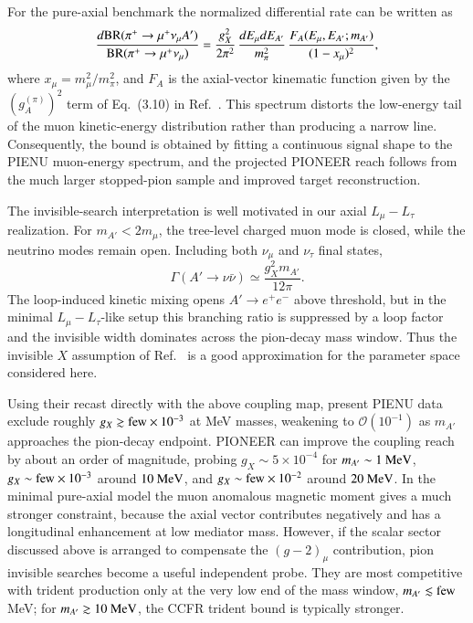 \documentclass[onecolumn, aps, nofootinbib, prd, preprint, floats, floatfix, amsmath, amssymb, superscriptaddress, preprintnumbers]{revtex4-1}
\begin{document}
For the pure-axial benchmark the normalized differential rate can be written as
\begin{equation}
\frac{d{\rm BR}(\pi^+\to\mu^+\nu_\mu A')}
{{\rm BR}(\pi^+\to\mu^+\nu_\mu)}
=\frac{g_X^2}{2\pi^2}\,
\frac{dE_\mu dE_{A'}}{m_\pi^2}\,
\frac{F_A(E_\mu,E_{A'};m_{A'})}{(1-x_\mu)^2},
\label{eq:pion-axial-spectrum}
\end{equation}
where \(x_\mu=m_\mu^2/m_\pi^2\), and \(F_A\) is the axial-vector kinematic function given by the \(\left(g_A^{(\pi)}\right)^2\) term of Eq.~(3.10) in Ref.~\cite{Altmannshofer:2026opc}. This spectrum distorts the low-energy tail of the muon kinetic-energy distribution rather than producing a narrow line. Consequently, the bound is obtained by fitting a continuous signal shape to the PIENU muon-energy spectrum, and the projected PIONEER reach follows from the much larger stopped-pion sample and improved target reconstruction.

The invisible-search interpretation is well motivated in our axial \(L_\mu-L_\tau\) realization. For \(m_{A'}<2m_\mu\), the tree-level charged muon mode is closed, while the neutrino modes remain open. Including both \(\nu_\mu\) and \(\nu_\tau\) final states,
\begin{equation}
\Gamma(A'\to\nu\bar\nu)\simeq \frac{g_X^2m_{A'}}{12\pi}.
\label{eq:ap-neutrino-width}
\end{equation}
The loop-induced kinetic mixing opens \(A'\to e^+e^-\) above threshold, but in the minimal \(L_\mu-L_\tau\)-like setup this branching ratio is suppressed by a loop factor and the invisible width dominates across the pion-decay mass window. Thus the invisible \(X\) assumption of Ref.~\cite{Altmannshofer:2026opc} is a good approximation for the parameter space considered here.


Using their recast directly with the above coupling map, present PIENU data exclude roughly \(g_X\gtrsim{\rm few}\times10^{-3}\) at MeV masses, weakening to \(\mathcal O(10^{-1})\) as \(m_{A'}\) approaches the pion-decay endpoint. PIONEER can improve the coupling reach by about an order of magnitude, probing \(g_X\sim5\times10^{-4}\) for \(m_{A'}\sim1~{\rm MeV}\), \(g_X\sim{\rm few}\times10^{-3}\) around \(10~{\rm MeV}\), and \(g_X\sim{\rm few}\times10^{-2}\) around \(20~{\rm MeV}\). In the minimal pure-axial model the muon anomalous magnetic moment gives a much stronger constraint, because the axial vector contributes negatively and has a longitudinal enhancement at low mediator mass. However, if the scalar sector discussed above is arranged to compensate the \((g-2)_\mu\) contribution, pion invisible searches become a useful independent probe. They are most competitive with trident production only at the very low end of the mass window, \(m_{A'}\lesssim{\rm few}\) MeV; for \(m_{A'}\gtrsim10~{\rm MeV}\), the CCFR trident bound is typically stronger.
\end{document}
